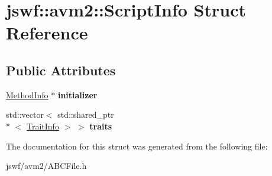 \hypertarget{structjswf_1_1avm2_1_1_script_info}{\section{jswf\+:\+:avm2\+:\+:Script\+Info Struct Reference}
\label{structjswf_1_1avm2_1_1_script_info}
}
\subsection*{Public Attributes}
\begin{DoxyCompactItemize}
\item 
\hypertarget{structjswf_1_1avm2_1_1_script_info_aa1a87ad4cf37262ec7971b2124984176}{\hyperlink{structjswf_1_1avm2_1_1_method_info}{Method\+Info} $\ast$ {\bfseries initializer}}\label{structjswf_1_1avm2_1_1_script_info_aa1a87ad4cf37262ec7971b2124984176}

\item 
\hypertarget{structjswf_1_1avm2_1_1_script_info_a38973fc9409477aa76e08ee4aabc0ca8}{std\+::vector$<$ std\+::shared\+\_\+ptr\\*
$<$ \hyperlink{structjswf_1_1avm2_1_1_trait_info}{Trait\+Info} $>$ $>$ {\bfseries traits}}\label{structjswf_1_1avm2_1_1_script_info_a38973fc9409477aa76e08ee4aabc0ca8}

\end{DoxyCompactItemize}


The documentation for this struct was generated from the following file\+:\begin{DoxyCompactItemize}
\item 
jswf/avm2/A\+B\+C\+File.\+h\end{DoxyCompactItemize}
